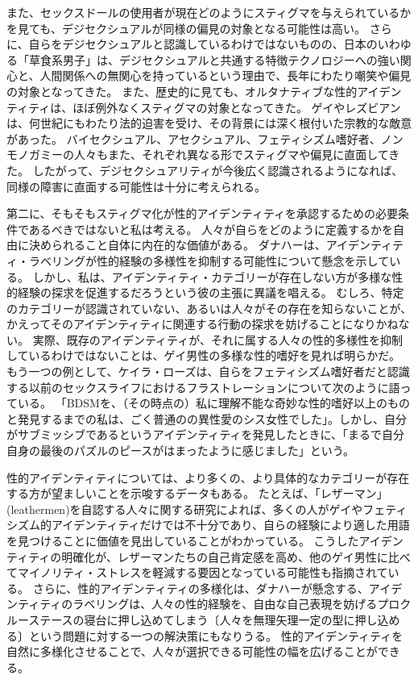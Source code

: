 \documentclass[paper=a4,book,openany]{jlreq} \usepackage{mystyle}
\begin{document}
また、セックスドールの使用者が現在どのようにスティグマを与えられているかを見ても、デジセクシュアルが同様の偏見の対象となる可能性は高い\citep{knox17:_sex_dolls}。
さらに、自らをデジセクシュアルと認識しているわけではないものの、日本のいわゆる「草食系男子」は、デジセクシュアルと共通する特徴{\DDASH}テクノロジーへの強い関心と、人間関係への無関心{\DDASH}を持っているという理由で、長年にわたり嘲笑や偏見の対象となってきた\citep{harney09:_herbiv_dilem}。
また、歴史的に見ても、オルタナティブな性的アイデンティティは、ほぼ例外なくスティグマの対象となってきた。
ゲイやレズビアンは、何世紀にもわたり法的迫害を受け、その背景には深く根付いた宗教的な敵意があった。
バイセクシュアル、アセクシュアル、フェティシズム嗜好者、ノンモノガミーの人々もまた、それぞれ異なる形でスティグマや偏見に直面してきた\citep{klein06:_sm_sadom_inter_issue_child_custod_proceed,wright06:_discr_sm_ident_indiv,balzarini18:_dimmin_halo_aroun_monog,rothblum20:_asexual_non_asexual_respon_u}。
したがって、デジセクシュアリティが今後広く認識されるようになれば、同様の障害に直面する可能性は十分に考えられる。

第二に、そもそもスティグマ化が性的アイデンティティを承認するための必要条件であるべきではないと私は考える。
人々が自らをどのように定義するかを自由に決められること自体に内在的な価値がある。
ダナハーは、アイデンティティ・ラベリングが性的経験の多様性を抑制する可能性について懸念を示している。
しかし、私は、アイデンティティ・カテゴリーが存在しない方が多様な性的経験の探求を促進するだろうという彼の主張に異議を唱える。
むしろ、特定のカテゴリーが認識されていない、あるいは人々がその存在を知らないことが、かえってそのアイデンティティに関連する行動の探求を妨げることになりかねない。
実際、既存のアイデンティティが、それに属する人々の性的多様性を抑制しているわけではないことは、ゲイ男性の多様な性的嗜好を見れば明らかだ。
もう一つの例として、ケイラ・ローズは、自らをフェティシズム嗜好者だと認識する以前のセックスライフにおけるフラストレーションについて次のように語っている。
「BDSMを、（その時点の）私に理解不能な奇妙な性的嗜好以上のものと発見するまでの私は、ごく普通のの異性愛のシス女性でした」。しかし、自分がサブミッシブであるというアイデンティティを発見したときに、「まるで自分自身の最後のパズルのピースがはまったように感じました」という\citep{lords:sexual_submission}。

性的アイデンティティについては、より多くの、より具体的なカテゴリーが存在する方が望ましいことを示唆するデータもある。
たとえば、「レザーマン」(leathermen)を自認する人々に関する研究によれば、多くの人がゲイやフェティシズム的アイデンティティだけでは不十分であり、自らの経験により適した用語を見つけることに価値を見出していることがわかっている\citep{kamel80:_leath}。
こうしたアイデンティティの明確化が、レザーマンたちの自己肯定感を高め、他のゲイ男性に比べてマイノリティ・ストレスを軽減する要因となっている可能性も指摘されている\citep{mosher16:_layer_leath,tatum16:_proxim_minor_stres_proces_subjec}。
さらに、性的アイデンティティの多様化は、ダナハーが懸念する、アイデンティティのラベリングは、人々の性的経験を、自由な自己表現を妨げるプロクルーステースの寝台に押し込めてしまう〔人々を無理矢理一定の型に押し込める〕という問題に対する一つの解決策にもなりうる。
性的アイデンティティを自然に多様化させることで、人々が選択できる可能性の幅を広げることができる。
\end{document}
